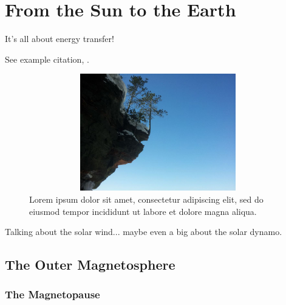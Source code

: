
\chapter{From the Sun to the Earth}
\label{ch_intro}

It's all about energy transfer! 


See example citation, \cite{dai_2015}. 




\begin{figure}
  \includegraphics[width=5.75in, height=2in]{figures/image.jpg}
  \caption{Lorem ipsum dolor sit amet, consectetur adipiscing elit, sed do eiusmod tempor incididunt ut labore et dolore magna aliqua.}
  \label{fig_test}
\end{figure}

Talking about the solar wind... maybe even a big about the solar dynamo. 


\section{The Outer Magnetosphere}

\subsection{The Magnetopause}

